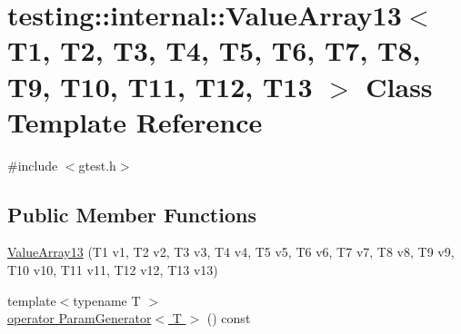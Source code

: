 \hypertarget{classtesting_1_1internal_1_1_value_array13}{\section{testing\-:\-:internal\-:\-:Value\-Array13$<$ T1, T2, T3, T4, T5, T6, T7, T8, T9, T10, T11, T12, T13 $>$ Class Template Reference}
\label{classtesting_1_1internal_1_1_value_array13}
}


{\ttfamily \#include $<$gtest.\-h$>$}

\subsection*{Public Member Functions}
\begin{DoxyCompactItemize}
\item 
\hyperlink{classtesting_1_1internal_1_1_value_array13_a57505ac7a4fbb86f4121bf1d41b0352d}{Value\-Array13} (T1 v1, T2 v2, T3 v3, T4 v4, T5 v5, T6 v6, T7 v7, T8 v8, T9 v9, T10 v10, T11 v11, T12 v12, T13 v13)
\item 
{\footnotesize template$<$typename T $>$ }\\\hyperlink{classtesting_1_1internal_1_1_value_array13_a7de4be3c2608feeffd479e3873e3fc87}{operator Param\-Generator$<$ T $>$} () const 
\end{DoxyCompactItemize}


